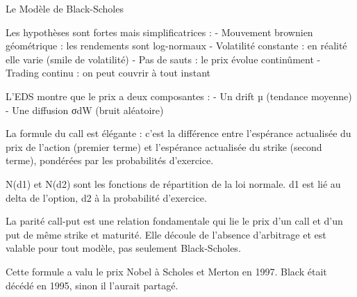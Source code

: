 \documentclass[aspectratio=169, 10pt]{beamer}
\begin{document}
\begin{frame}{Le Modèle de Black-Scholes}
{        Les hypothèses sont fortes mais simplificatrices :
        - Mouvement brownien géométrique : les rendements sont log-normaux
        - Volatilité constante : en réalité elle varie (smile de volatilité)
        - Pas de sauts : le prix évolue continûment
        - Trading continu : on peut couvrir à tout instant
        
        L'EDS montre que le prix a deux composantes :
        - Un drift µ (tendance moyenne)
        - Une diffusion σdW (bruit aléatoire)
        
        La formule du call est élégante : c'est la différence entre
        l'espérance actualisée du prix de l'action (premier terme)
        et l'espérance actualisée du strike (second terme),
        pondérées par les probabilités d'exercice.
        
        N(d1) et N(d2) sont les fonctions de répartition de la loi normale.
        d1 est lié au delta de l'option, d2 à la probabilité d'exercice.
        
        La parité call-put est une relation fondamentale qui lie
        le prix d'un call et d'un put de même strike et maturité.
        Elle découle de l'absence d'arbitrage et est valable pour tout modèle,
        pas seulement Black-Scholes.
        
        Cette formule a valu le prix Nobel à Scholes et Merton en 1997.
        Black était décédé en 1995, sinon il l'aurait partagé.
    }
\end{frame}
\end{document}
